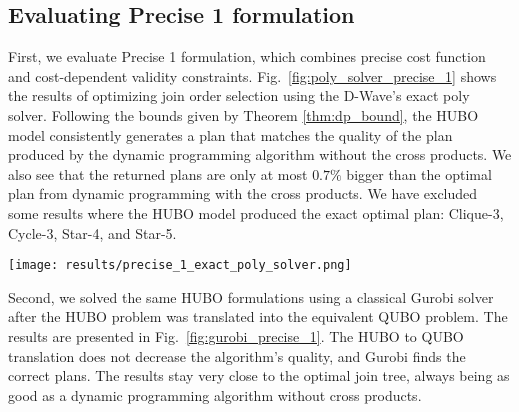 \subsection{Evaluating \textrm{Precise 1} formulation}

First, we evaluate \textrm{Precise 1} formulation, which combines precise cost function and cost-dependent validity constraints. Fig.~\ref{fig:poly_solver_precise_1} shows the results of optimizing join order selection using the D-Wave's exact poly solver. Following the bounds given by Theorem \ref{thm:dp_bound}, the HUBO model consistently generates a plan that matches the quality of the plan produced by the dynamic programming algorithm without the cross products. We also see that the returned plans are only at most $0.7\%$ bigger than the optimal plan from dynamic programming with the cross products. We have excluded some results where the HUBO model produced the exact optimal plan: Clique-3, Cycle-3, Star-4, and Star-5.

\begin{figure*}[tbh]
    \centering
    \texttt{[image: results/precise\_1\_exact\_poly\_solver.png]}
    \caption{Precise 1 results using the D-Wave's exact poly solver}
    \label{fig:poly_solver_precise_1}
\end{figure*}


Second, we solved the same HUBO formulations using a classical Gurobi solver after the HUBO problem was translated into the equivalent QUBO problem. The results are presented in Fig.~\ref{fig:gurobi_precise_1}. The HUBO to QUBO translation does not decrease the algorithm's quality, and Gurobi finds the correct plans. The results stay very close to the optimal join tree, always being as good as a dynamic programming algorithm without cross products.

